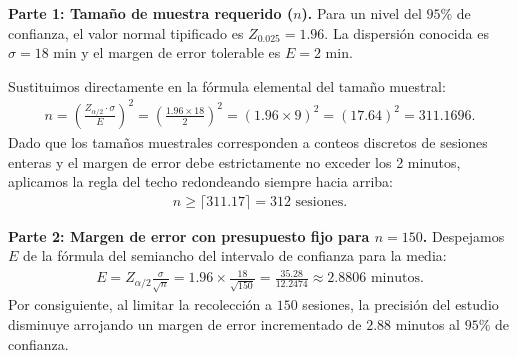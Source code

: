 \begin{solproblema}
	\textbf{Parte 1: Tamaño de muestra requerido ($n$).}
	Para un nivel del $95\%$ de confianza, el valor normal tipificado es $Z_{0.025} = 1.96$. La dispersión conocida es $\sigma = 18$ min y el margen de error tolerable es $E = 2$ min.
	
	Sustituimos directamente en la fórmula elemental del tamaño muestral:
	\begin{align}
		n = \left( \frac{Z_{\alpha/2} \cdot \sigma}{E} \right)^2 = \left( \frac{1.96 \times 18}{2} \right)^2 = (1.96 \times 9)^2 = (17.64)^2 = 311.1696.
	\end{align}
	Dado que los tamaños muestrales corresponden a conteos discretos de sesiones enteras y el margen de error debe estrictamente no exceder los 2 minutos, aplicamos la regla del techo redondeando siempre hacia arriba:
	\begin{align}
		n \geq \lceil 311.17 \rceil = 312 \text{ sesiones.}
	\end{align}
	
	\textbf{Parte 2: Margen de error con presupuesto fijo para $n = 150$.}
	Despejamos $E$ de la fórmula del semiancho del intervalo de confianza para la media:
	\begin{align}
		E = Z_{\alpha/2} \frac{\sigma}{\sqrt{n}} = 1.96 \times \frac{18}{\sqrt{150}} = \frac{35.28}{12.2474} \approx 2.8806 \text{ minutos.}
	\end{align}
	Por consiguiente, al limitar la recolección a $150$ sesiones, la precisión del estudio disminuye arrojando un margen de error incrementado de $2.88$ minutos al $95\%$ de confianza.
\end{solproblema}

